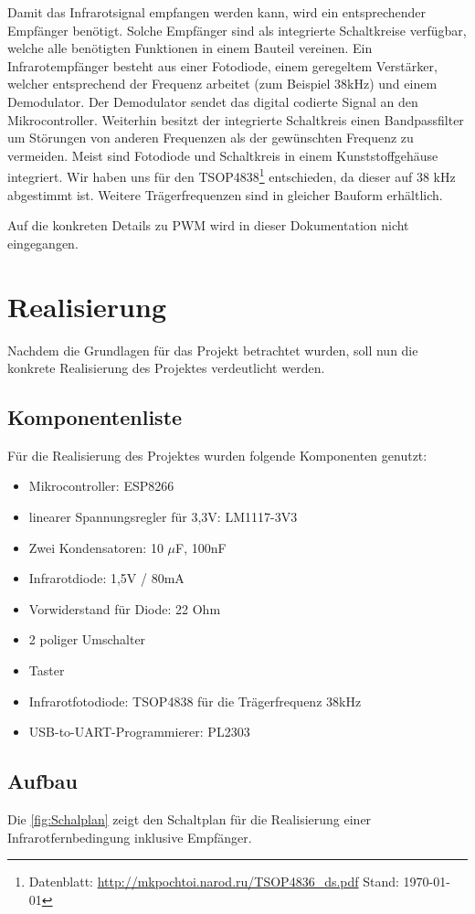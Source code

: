 Damit das Infrarotsignal empfangen werden kann, wird ein entsprechender Empfänger benötigt.
Solche Empfänger sind als integrierte Schaltkreise verfügbar, welche alle benötigten Funktionen in einem Bauteil vereinen.
Ein Infrarotempfänger besteht aus einer Fotodiode, einem geregeltem Verstärker, welcher entsprechend der Frequenz arbeitet (zum Beispiel 38kHz) und einem Demodulator.
Der Demodulator sendet das digital codierte Signal an den Mikrocontroller.
Weiterhin besitzt der integrierte Schaltkreis einen Bandpassfilter um Störungen von anderen Frequenzen als der gewünschten Frequenz zu vermeiden.
Meist sind Fotodiode und Schaltkreis in einem Kunststoffgehäuse integriert.
Wir haben uns für den TSOP4838\footnote{Datenblatt: \url{http://mkpochtoi.narod.ru/TSOP4836_ds.pdf} Stand: \today} entschieden, da dieser auf 38 kHz abgestimmt ist. Weitere Trägerfrequenzen sind in gleicher Bauform erhältlich.

Auf die konkreten Details zu \acs{PWM} wird in dieser Dokumentation nicht eingegangen.

\section{Realisierung}
Nachdem die Grundlagen für das Projekt betrachtet wurden, soll nun die konkrete Realisierung des Projektes verdeutlicht werden.
\subsection{Komponentenliste}
Für die Realisierung des Projektes wurden folgende Komponenten genutzt:
\begin{itemize}
	\item Mikrocontroller: ESP8266
	\item linearer Spannungsregler für 3,3V: LM1117-3V3
	\item Zwei Kondensatoren: 10 $\mu$F, 100nF
	\item Infrarotdiode: 1,5V / 80mA
	\item Vorwiderstand für Diode: 22 Ohm
	\item 2 poliger Umschalter
	\item Taster
	\item Infrarotfotodiode: TSOP4838 für die Trägerfrequenz 38kHz
	\item USB-to-UART-Programmierer: PL2303
\end{itemize}


\subsection{Aufbau}
Die \autoref{fig:Schalplan} zeigt den Schaltplan für die Realisierung einer Infrarotfernbedingung inklusive Empfänger.

